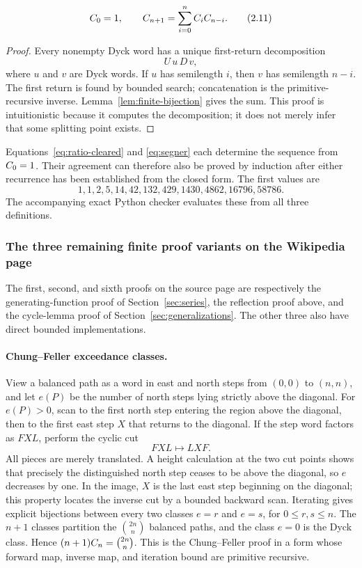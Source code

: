 \begin{theorem}
\label{thm:segner}
\[
 C_0=1,
 \qquad
 C_{n+1}=\sum_{i=0}^{n}C_iC_{n-i}.                      \tag{2.11}\label{eq:segner}
\]
\end{theorem}

\begin{proof}
Every nonempty Dyck word has a unique first-return decomposition
\[
 U\,u\,D\,v,
\]
where $u$ and $v$ are Dyck words.  If $u$ has semilength $i$, then $v$ has
semilength $n-i$.  The first return is found by bounded search; concatenation
is the primitive-recursive inverse.  Lemma~\ref{lem:finite-bijection} gives the
sum.  This proof is intuitionistic because it computes the decomposition; it
does not merely infer that some splitting point exists.
\end{proof}

Equations~\eqref{eq:ratio-cleared} and \eqref{eq:segner} each determine the
sequence from $C_0=1$.  Their agreement can therefore also be proved by
induction after either recurrence has been established from the closed form.
The first values are
\[
 1,1,2,5,14,42,132,429,1430,4862,16796,58786.
\]
The accompanying exact Python checker evaluates these from all three
definitions.

\subsubsection{The three remaining finite proof variants on the Wikipedia page}

The first, second, and sixth proofs on the source page are respectively the
generating-function proof of Section~\ref{sec:series}, the reflection proof
above, and the cycle-lemma proof of Section~\ref{sec:generalizations}.  The
other three also have direct bounded implementations.

\paragraph{Chung--Feller exceedance classes.}
View a balanced path as a word in east and north steps from $(0,0)$ to
$(n,n)$, and let $e(P)$ be the number of north steps lying strictly above the
diagonal.  For $e(P)>0$, scan to the first north step entering the region
above the diagonal, then to the first east step $X$ that returns to the
diagonal.  If the step word factors as $F X L$, perform the cyclic cut
\[
                  F X L\longmapsto L X F.                       \tag{2.11a}
\]
All pieces are merely translated.  A height calculation at the two cut
points shows that precisely the distinguished north step ceases to be above
the diagonal, so $e$ decreases by one.  In the image, $X$ is the last east
step beginning on the diagonal; this property locates the inverse cut by a
bounded backward scan.  Iterating gives explicit bijections between every two
classes $e=r$ and $e=s$, for $0\le r,s\le n$.  The $n+1$ classes partition the
$\binom{2n}{n}$ balanced paths, and the class $e=0$ is the Dyck class.  Hence
$(n+1)C_n=\binom{2n}{n}$.  This is the Chung--Feller proof in a form whose
forward map, inverse map, and iteration bound are primitive recursive.

